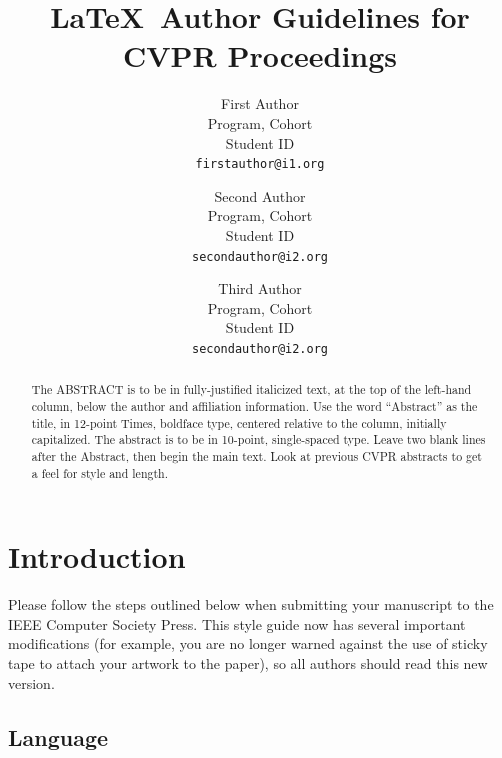 \documentclass[10pt,twocolumn,letterpaper]{article}
\begin{document}
\title{\LaTeX\ Author Guidelines for CVPR Proceedings}

\author{First Author\\
Program, Cohort\\ %
Student ID\\
{\tt\small firstauthor@i1.org}
\and
Second Author\\
Program, Cohort\\ %
Student ID\\
{\tt\small secondauthor@i2.org}
\and
Third Author\\
Program, Cohort\\ %
Student ID\\
{\tt\small secondauthor@i2.org}
}

\maketitle

\begin{abstract}
   The ABSTRACT is to be in fully-justified italicized text, at the top
   of the left-hand column, below the author and affiliation
   information. Use the word ``Abstract'' as the title, in 12-point
   Times, boldface type, centered relative to the column, initially
   capitalized. The abstract is to be in 10-point, single-spaced type.
   Leave two blank lines after the Abstract, then begin the main text.
   Look at previous CVPR abstracts to get a feel for style and length.
\end{abstract}

\section{Introduction}

Please follow the steps outlined below when submitting your manuscript to
the IEEE Computer Society Press.  This style guide now has several
important modifications (for example, you are no longer warned against the
use of sticky tape to attach your artwork to the paper), so all authors
should read this new version.

\subsection{Language}
\end{document}
